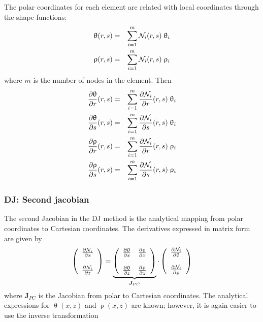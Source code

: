 The polar coordinates for each element are related with local coordinates through the shape functions:
\begin{eqnarray}
\uptheta(r,s) &=& \sum_{i=1}^m {\mathcal{N}}_i(r,s) \; \uptheta_i\\
\uprho(r,s) &=&  \sum_{i=1}^m {\mathcal{N}}_i(r,s) \; \uprho_i
\end{eqnarray}
where $m$ is the number of nodes in the element.
Then
\begin{eqnarray}
\frac{\partial\uptheta}{\partial r}(r,s) &=& \sum_{i=1}^m \frac{\partial{\mathcal{N}}_i}{\partial r}(r,s)\; \uptheta_i\\
\frac{\partial\uptheta}{\partial s}(r,s) &=& \sum_{i=1}^m \frac{\partial{\mathcal{N}}_i}{\partial s}(r,s)\; \uptheta_i\\
\frac{\partial\uprho}{\partial r}(r,s)   &=& \sum_{i=1}^m \frac{\partial{\mathcal{N}}_i}{\partial r}(r,s)\; \uprho_i \\
\frac{\partial\uprho}{\partial s}(r,s)   &=& \sum_{i=1}^m \frac{\partial{\mathcal{N}}_i}{\partial s}(r,s)\; \uprho_i
\end{eqnarray}



\subsubsection{DJ: Second jacobian}

The second Jacobian in the DJ method is the analytical mapping from polar coordinates to Cartesian coordinates. The derivatives expressed in matrix form are given by
\begin{equation}
\left(
\begin{array}{c}
\frac{\partial {\mathcal{N}}_i}{\partial x} \\ \\
\frac{\partial {\mathcal{N}}_i}{\partial z} 
\end{array}
\right)
= 
\underbrace{\left(
\begin{array}{cc}
\frac{\partial \uptheta}{\partial x}  & 
\frac{\partial \uprho}{\partial x}   \\ \\
\frac{\partial \uptheta}{\partial z}  & 
\frac{\partial \uprho}{\partial z}  
\end{array}
\right)}_{{\bm J}_{PC}}
\cdot
\left(
\begin{array}{c}
\frac{\partial {\mathcal{N}}_i}{\partial \uptheta} \\ \\
\frac{\partial {\mathcal{N}}_i}{\partial \uprho} 
\end{array}
\right)
\label{eq:DJ3}
\end{equation}
where ${\bm J}_{PC}$ is the Jacobian from polar to Cartesian coordinates. The analytical expressions for 
$\uptheta(x,z)$ and $\uprho(x,z)$ are known; however, it is again easier to use the inverse transformation

